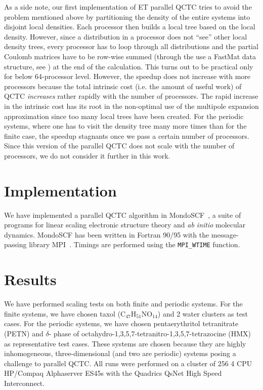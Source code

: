 \commentoutA{\documentclass[prl,aps,twocolumn,twocolumngrid,superbib]{revtex4}}
\begin{document}
As a side note, our first implementation of ET parallel QCTC tries to
avoid the problem mentioned above by partitioning the density of the entire
systems into disjoint local densities. Each processor then builds a
local tree based on the local density. However, since a distribution
in a processor does not ``see'' other local density trees, every
processor has to loop through all distributions and the partial
Coulomb matrices have to be row-wise summed (through the use a FastMat
data structure, see \cite{CGan03}) at the end of the calculation. This
turns out to be practical only for below 64-processor level. However,
the speedup does not increase with more processors because the
total intrinsic cost (i.e. the amount of useful work) of QCTC {\it increases}
rather rapidly with the number of processors. The rapid increase in
the intrinsic cost has its root in the non-optimal use of the
multipole expansion approximation since too many local trees have been
created. For the periodic systems, where one has to visit the density
tree many more times than for the finite case, the speedup
stagnants once we pass a certain number of processors. Since
this version of the parallel QCTC does not scale with the number of
processors, we do not consider it further in this work.

\section{Implementation}
\label{sec:implementation}
We have implemented a parallel QCTC algorithm in {\sc
MondoSCF}~\cite{MondoSCF}, a suite of programs for linear scaling
electronic structure theory and {\it ab initio}\/ molecular dynamics.
{\sc MondoSCF} has been written in Fortran 90/95 with the
message-passing library MPI~\cite{mpi}.  Timings are performed using
the {\tt MPI\_WTIME} function.

\section{Results}
\label{results}
We have performed scaling tests on both finite and periodic
systems. For the finite systems, we have chosen taxol
(C$_{47}$H$_{51}$NO$_{14}$) and 2 water clusters as test cases. For
the periodic systems, we have chosen pentaerythritol tetranitrate
(PETN)\cite{Gan_2004} and $\delta$- phase of
octahydro-1,3,5,7-tetranitro-1,3,5,7-tetrazocine
(HMX)\cite{Lewis_00v104} as representative test cases. These systems
are chosen because they are highly inhomogeneous, three-dimensional
(and two are periodic) systems posing a challenge to parallel
QCTC. All runs were performed on a cluster of 256 4 CPU HP/Compaq
Alphaserver ES45s with the Quadrics QsNet High Speed Interconnect.
\end{document}
